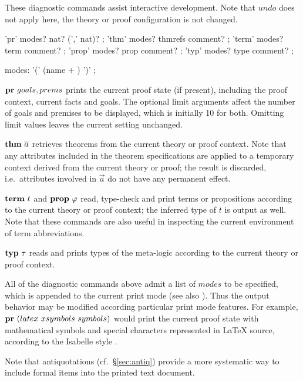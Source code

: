 These diagnostic commands assist interactive development.  Note that $undo$
does not apply here, the theory or proof configuration is not changed.

\begin{rail}
  'pr' modes? nat? (',' nat)?
  ;
  'thm' modes? thmrefs comment?
  ;
  'term' modes? term comment?
  ;
  'prop' modes? prop comment?
  ;
  'typ' modes? type comment?
  ;

  modes: '(' (name + ) ')'
  ;
\end{rail}

\begin{descr}
\item [${\mathord{\mathbf{pr}}}~goals, prems$] prints the current proof state (if
  present), including the proof context, current facts and goals.  The
  optional limit arguments affect the number of goals and premises to be
  displayed, which is initially 10 for both.  Omitting limit values leaves the
  current setting unchanged.
\item [${\mathord{\mathbf{thm}}}~\overline{a}$] retrieves theorems from the current theory
  or proof context.  Note that any attributes included in the theorem
  specifications are applied to a temporary context derived from the current
  theory or proof; the result is discarded, i.e.\ attributes involved in $\vec
  a$ do not have any permanent effect.
\item [${\mathord{\mathbf{term}}}~t$ and ${\mathord{\mathbf{prop}}}~\varphi$] read, type-check
  and print terms or propositions according to the current theory or proof
  context; the inferred type of $t$ is output as well.  Note that these
  commands are also useful in inspecting the current environment of term
  abbreviations.
\item [${\mathord{\mathbf{typ}}}~\tau$] reads and prints types of the meta-logic
  according to the current theory or proof context.
\end{descr}

All of the diagnostic commands above admit a list of $modes$ to be specified,
which is appended to the current print mode (see also \cite{isabelle-ref}).
Thus the output behavior may be modified according particular print mode
features.  For example, ${\mathord{\mathbf{pr}}}~(latex~xsymbols~symbols)$ would
print the current proof state with mathematical symbols and special characters
represented in {\LaTeX} source, according to the Isabelle style
\cite{isabelle-sys}.

Note that antiquotations (cf.\ \S\ref{sec:antiq}) provide a more systematic
way to include formal items into the printed text document.


